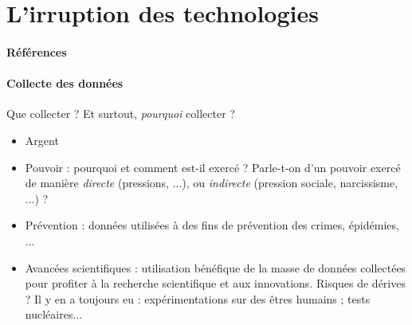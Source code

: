 \section{L'irruption des technologies}
\paragraph{Références} \cite{Damasio0} \cite{Marx1} \cite{TechnoSocio0} \cite{GhostInTheShell}

\paragraph{Collecte des données} Que collecter ? Et surtout, \emph{pourquoi} collecter ?
\begin{itemize}
    \item Argent
    \item Pouvoir : pourquoi et comment est-il exercé ? Parle-t-on d'un pouvoir exercé de
    manière \emph{directe} (pressions, ...), ou \emph{indirecte} (pression sociale,
    narcissisme, ...) ?
    \item Prévention : données utilisées à des fins de prévention des crimes, épidémies, ...
    \item Avancées scientifiques : utilisation bénéfique de la masse de données collectées
    pour profiter à la recherche scientifique et aux innovations. Risques de dérives ? Il y
    en a toujours eu : expérimentations sur des êtres humains ; tests nucléaires... 
\end{itemize}